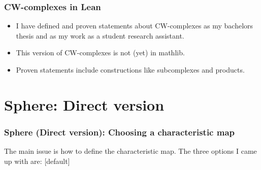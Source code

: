 \documentclass{beamer}
\begin{document}
\begin{frame}
  \frametitle{CW-complexes in Lean}
  \begin{itemize}
    \item I have defined and proven statements about CW-complexes as my bachelors thesis and as my work as a student research assistant.
    \item This version of CW-complexes is not (yet) in mathlib. 
    \item Proven statements include constructions like subcomplexes and products.
  \end{itemize}
\end{frame}

\section{Sphere: Direct version}

\begin{frame}
  \frametitle{Sphere (Direct version): Choosing a characteristic map}
  The main issue is how to define the characteristic map. 
  The three options I came up with are: 
  [default]
  \begin{itemize}
    \begin{itemize}
    \end{itemize}
    \begin{itemize}
    \end{itemize}
    \begin{itemize}
    \end{itemize}
  \end{itemize}
  \end{frame}
\end{document}

